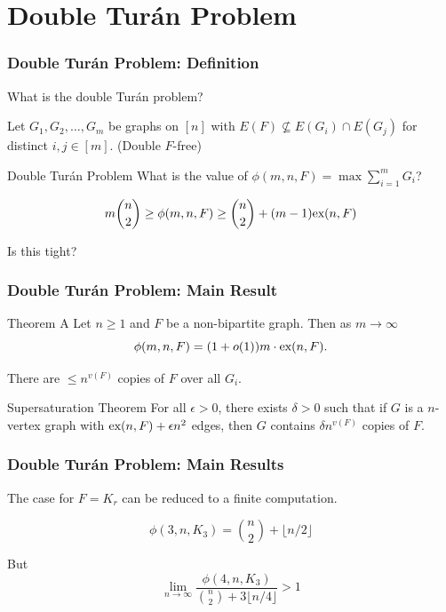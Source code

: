 \documentclass{beamer}
\newcommand*{\ex}{\textnormal{ex}}
\begin{document}
\section{Double Turán Problem}

\begin{frame}
\frametitle{Double Turán Problem: Definition}

What is the double Turán problem? \pause

\vspace{0.5cm}

Let $G_1, G_2, \ldots, G_m$ be graphs on $[n]$ with $E(F) \not\subseteq E(G_i) \cap E(G_j)$ for distinct $i, j \in [m]$. \pause (\alert{Double $F$-free})

\pause

\begin{block}{Double Turán Problem}
  What is the value of $\phi(m, n, F) = \max \sum_{i = 1}^m G_i$?
\end{block}

\pause

\[
  m\binom{n}{2} \geq \phi(m, n, F) \geq \binom{n}{2} + (m - 1)\ex(n, F)
\]

\pause

Is this tight?
\end{frame}

\begin{frame}
  \frametitle{Double Turán Problem: Main Result}

  \begin{block}{Theorem A}
    Let $n \geq 1$ and $F$ be a non-bipartite graph. Then as $m \to \infty$
    \[ 
      \phi(m, n, F) = (1 + o(1))m \cdot \ex(n, F).
    \]
  \end{block}

  \pause

  \vspace{0.3cm}

  There are $\leq n^{v(F)}$ copies of $F$ over all $G_i$.

  \pause

  \begin{block}{Supersaturation Theorem \cite{ErdosSimonovits1983}}
    For all $\epsilon > 0$, there exists $\delta > 0$ such that if $G$ is a $n$-vertex graph with $\ex(n,F) + \epsilon n^2$ edges, then  $G$ contains $\delta n^{v(F)}$ copies of $F$.
  \end{block}
\end{frame}

\begin{frame}
  \frametitle{Double Turán Problem: Main Results}

  The case for $F = K_r$ can be reduced to a finite computation.

  \pause

  \[
    \phi(3, n, K_3) = \binom{n}{2} + \lfloor n/2\rfloor
  \]

  \pause
  
  But 
  \[
    \lim_{n \to \infty} \frac{\phi(4, n, K_3)}{\binom{n}{2} + 3\lfloor n/4\rfloor} > 1
  \]
\end{frame}
\end{document}
